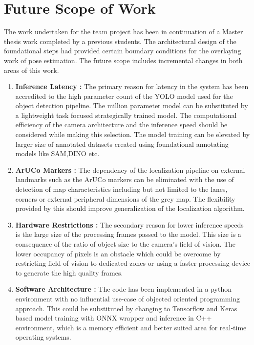 \chapter{Future Scope of Work}
\label{ch:futurescope}

The work undertaken for the team project has been in continuation of a Master thesis work completed by a previous students. The architectural design of the foundational steps had provided certain boundary conditions for the overlaying work of pose estimation. The future scope includes incremental changes in both areas of this work.

\begin{enumerate}[label=\textbf{Area \arabic*:}, leftmargin=*, itemsep=1em] 
	\item \textbf{Inference Latency :} The primary reason for latency in the system has been accredited to the high parameter count of the YOLO model used for the object detection pipeline. The million parameter model can be substituted by a lightweight task focused strategically trained model. The computational efficiency of the camera architecture and the inference speed should be considered while making this selection. The model training can be elevated by larger size of annotated datasets created using foundational annotating models like SAM,DINO etc.
	
	\item \textbf{ArUCo Markers :} The dependency of the localization pipeline on external landmarks such as the ArUCo markers can be eliminated with the use of detection of map characteristics including but not limited to the lanes, corners or external peripheral dimensions of the grey map. The flexibility provided by this should improve generalization of the localization algorithm.
	
	\item \textbf{Hardware Restrictions :} The secondary reason for lower inference speeds is the large size of the processing frames passed to the model. This size is a consequence of the ratio of object size to the camera's field of vision. The lower occupancy of pixels is an obstacle which could be overcome by restricting field of vision to dedicated zones or using a faster processing device to generate the high quality frames.
	
	\item \textbf{Software Architecture :} The code has been implemented in a python environment with no influential use-case of objected oriented programming approach. This could be substituted by changing to Tensorflow and Keras based model training with ONNX wrapper and inference in C++ environment, which is a memory efficient and better suited area for real-time operating systems.
	

\end{enumerate}